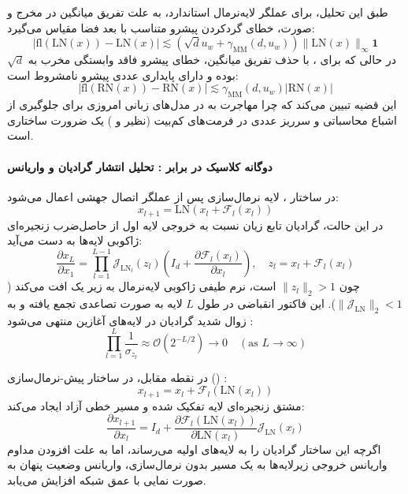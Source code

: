 طبق این تحلیل، برای عملگر لایه‌نرمال استاندارد، به علت تفریق میانگین در مخرج و صورت، خطای گردکردن پیشرو متناسب با بعد فضا مقیاس می‌گیرد:
\begin{equation}
    |\text{fl}(\text{LN}(x)) - \text{LN}(x)| \lesssim \left(\sqrt{d} u_w + \gamma_{\text{MM}}(d, u_w)\right) \|\text{LN}(x)\|_\infty \mathbf{1}
\end{equation}
در حالی که برای ، با حذف تفریق میانگین، خطای پیشرو فاقد وابستگی مخرب به $\sqrt{d}$ بوده و دارای پایداری عددی پیشرو نامشروط است:
\begin{equation}
    |\text{fl}(\text{RN}(x)) - \text{RN}(x)| \lesssim \gamma_{\text{MM}}(d, u_w) |\text{RN}(x)|
\end{equation}
این قضیه تبیین می‌کند که چرا مهاجرت به  در مدل‌های زبانی امروزی برای جلوگیری از اشباع محاسباتی و سرریز عددی در فرمت‌های کم‌بیت (نظیر  و ) یک ضرورت ساختاری است.

\paragraph*{دوگانه کلاسیک  در برابر : تحلیل انتشار گرادیان و واریانس}
در ساختار ، لایه نرمال‌سازی پس از عملگر اتصال جهشی اعمال می‌شود:
\begin{equation}
    x_{l+1} = \text{LN}(x_l + \mathcal{F}_l(x_l))
\end{equation}
در این حالت، گرادیان تابع زیان نسبت به خروجی لایه اول از حاصل‌ضرب زنجیره‌ای ژاکوبی لایه‌ها به دست می‌آید:
\begin{equation}
    \frac{\partial x_L}{\partial x_1} = \prod_{l=1}^{L-1} \mathcal{J}_{\text{LN}_l}(z_l) \left( I_d + \frac{\partial \mathcal{F}_l(x_l)}{\partial x_l} \right), \quad z_l = x_l + \mathcal{F}_l(x_l)
\end{equation}
چون $\|z_l\|_2 > 1$ است، نرم طیفی ژاکوبی لایه‌نرمال به زیر یک افت می‌کند ($\|\mathcal{J}_{\text{LN}}\|_2 < 1$). این فاکتور انقباضی در طول $L$ لایه به صورت تصاعدی تجمع یافته و به زوال شدید گرادیان در لایه‌های آغازین منتهی می‌شود \cite{li2025mixln, chen2026keel}:
\begin{equation}
    \prod_{l=1}^L \frac{1}{\sigma_{z_l}} \approx \mathcal{O}\left( 2^{-L/2} \right) \to 0 \quad (\text{as } L \to \infty)
\end{equation}

در نقطه مقابل، در ساختار پیش-نرمال‌سازی () \cite{radford2019language}:
\begin{equation}
    x_{l+1} = x_l + \mathcal{F}_l(\text{LN}(x_l))
\end{equation}
مشتق زنجیره‌ای لایه تفکیک شده و مسیر خطی آزاد ایجاد می‌کند:
\begin{equation}
    \frac{\partial x_{l+1}}{\partial x_l} = I_d + \frac{\partial \mathcal{F}_l(\text{LN}(x_l))}{\partial \text{LN}(x_l)} \mathcal{J}_{\text{LN}}(x_l)
\end{equation}
اگرچه این ساختار گرادیان را به لایه‌های اولیه می‌رساند، اما به علت افزودن مداوم واریانس خروجی زیرلایه‌ها به یک مسیر بدون نرمال‌سازی، واریانس وضعیت پنهان به صورت نمایی با عمق شبکه افزایش می‌یابد.

